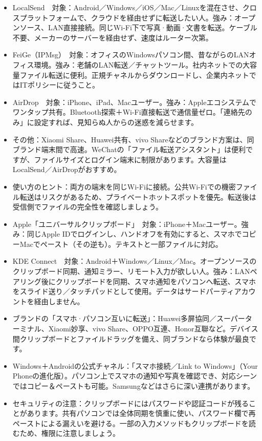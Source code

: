 
\begin{itemize}
  \item LocalSend　対象：Android／Windows／iOS／Mac／Linuxを混在させ、クロスプラットフォームで、クラウドを経由せずに転送したい人。強み：オープンソース、LAN直接接続。同じWi-Fi下で写真·動画·文書を転送。ケーブル不要、メーカーのサーバーを経由せず、速度はルーター次第。
  \item FeiGe（IPMsg）　対象：オフィスのWindowsパソコン間、昔ながらのLANオフィス環境。強み：老舗のLAN転送／チャットツール。社内ネットでの大容量ファイル転送に便利。正規チャネルからダウンロードし、企業内ネットではITポリシーに従うこと。
  \item AirDrop　対象：iPhone、iPad、Macユーザー。強み：Appleエコシステムでワンタップ共有。Bluetooth探索＋Wi-Fi直接転送で通信量ゼロ。「連絡先のみ」に設定すれば、見知らぬ人からの迷惑を減らせます。
  \item その他：Xiaomi Share、Huawei共有、vivo Shareなどのブランド方案は、同ブランド端末間で高速。WeChatの「ファイル転送アシスタント」は便利ですが、ファイルサイズとログイン端末に制限があります。大容量はLocalSend／AirDropがおすすめ。
  \item 使い方のヒント：両方の端末を同じWi-Fiに接続。公共Wi-Fiでの機密ファイル転送はリスクがあるため、プライベートホットスポットを優先。転送後は受信側でファイルの完全性を確認しましょう。
\end{itemize}


\begin{itemize}
  \item Apple「ユニバーサルクリップボード」　対象：iPhone＋Macユーザー。強み：同じApple IDでログインし、ハンドオフを有効にすると、スマホでコピーMacでペースト（その逆も）。テキストと一部ファイルに対応。
  \item KDE Connect　対象：Android＋Windows／Linux／Mac。オープンソースのクリップボード同期、通知ミラー、リモート入力が欲しい人。強み：LANペアリング後にクリップボードを同期、スマホ通知をパソコンへ転送、スマホをスライド送り／タッチパッドとして使用。データはサードパーティアカウントを経由しません。
  \item ブランドの「スマホ·パソコン互いに転送」：Huawei多屏協同／スーパーターミナル、Xiaomi妙享、vivo Share、OPPO互連、Honor互聯など。デバイス間クリップボードとファイルドラッグを備え、同ブランドなら体験が最良です。
  \item Windows＋Androidの公式チャネル：「スマホ接続／Link to Windows」（Your Phoneの進化版）。パソコン上でスマホの通知や写真を確認でき、対応シーンではコピー＆ペーストも可能。Samsungなどはさらに深い連携があります。
  \item セキュリティの注意：クリップボードにはパスワードや認証コードが残ることがあります。共有パソコンでは全体同期を慎重に使い、パスワード欄で再ペーストによる漏えいを避ける。一部の入力メソッドもクリップボードを読むため、権限に注意しましょう。
\end{itemize}

